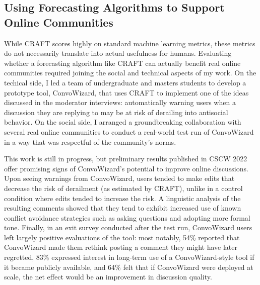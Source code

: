 \documentclass[11pt,letterpaper]{article}
\begin{document}
\subsection{Using Forecasting Algorithms to Support Online Communities}
While CRAFT scores highly on standard machine learning metrics, these metrics do not necessarily translate into actual usefulness for humans.
Evaluating whether a forecasting algorithm like CRAFT can actually benefit real online communities required joining the social and technical aspects of my work.
On the techical side, I led a team of undergraduate and masters students to develop a prototype tool, ConvoWizard, that uses CRAFT to implement one of the ideas discussed in the moderator interviews: automatically warning users when a discussion they are replying to may be at risk of derailing into antisocial behavior.
On the social side, I arranged a groundbreaking collaboration with several real online communities to conduct a real-world test run of ConvoWizard in a way that was respectful of the community's norms.

This work is still in progress, but preliminary results published in CSCW 2022 \cite{chang_thread_2022} offer promising signs of ConvoWizard's potential to improve online discussions.
Upon seeing warnings from ConvoWizard, users tended to make edits that decrease the risk of derailment (as estimated by CRAFT), unlike in a control condition where edits tended to increase the risk.
A linguistic analysis of the resulting comments showed that they tend to exhibit increased use of known conflict avoidance strategies such as asking questions and adopting more formal tone.
Finally, in an exit survey conducted after the test run, ConvoWizard users left largely positive evaluations of the tool: most notably, 54\% reported that ConvoWizard made them rethink posting a comment they might have later regretted, 83\% expressed interest in long-term use of a ConvoWizard-style tool if it became publicly available, and 64\% felt that if ConvoWizard were deployed at scale, the net effect would be an improvement in discussion quality.
\end{document}

